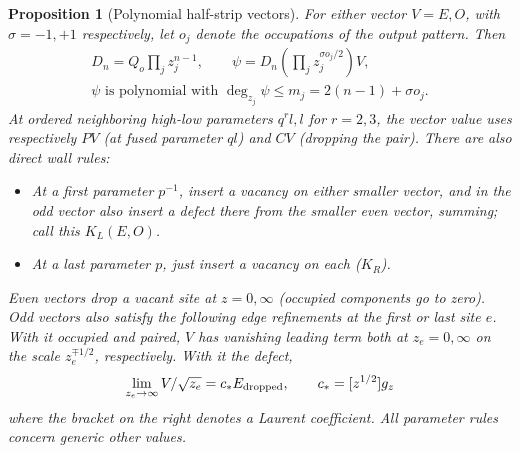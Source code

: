 \documentclass[11pt]{article}
\numberwithin{equation}{section}
\newtheorem{proposition}[theorem]{Proposition}
\theoremstyle{definition}\newtheorem{definition}[theorem]{Definition}
\theoremstyle{remark}\newtheorem{remark}[theorem]{Remark}
\begin{document}
\begin{proposition}[Polynomial half-strip vectors]\label{L:prop:strip-polynomials}
For either vector \(V=E,O\), with \(\sigma=-1,+1\) respectively, let \(o_j\)
denote the occupations of the output pattern. Then
\[
\begin{gathered}
 D_n=Q_o\prod_j z_j^{n-1},\qquad
 \psi= D_n \left(\prod_j z_j^{\sigma o_j/2}\right)V,\\
 \psi\text{ is polynomial with }\deg_{z_j}\psi\le m_j=2(n-1)+\sigma o_j.
\end{gathered}
\]
At ordered neighboring high-low parameters \(q^r l,l\) for \(r=2,3\), the vector value uses respectively \(P V\) (at fused parameter \(q l\)) and \(C V\) (dropping the pair). There are also direct wall rules:
\begin{itemize}
\item At a first parameter \(p^{-1}\), insert a vacancy on either smaller vector, and in the odd vector also insert a defect there from the smaller even vector, summing; call this \(K_L(E,O)\).
\item At a last parameter \(p\), just insert a vacancy on each (\(K_R\)).
\end{itemize}

Even vectors drop a vacant site at \(z=0,\infty\) (occupied components go to zero). Odd vectors also satisfy the following edge refinements at the first or last site \(e\). With it occupied and paired, \(V\) has vanishing leading term both at \(z_e=0,\infty\) on the scale \(z_e^{\mp1/2}\), respectively. With it the defect,
\[
 \lim_{z_e\to\infty} V/\sqrt{z_e}=c_* E_{\rm dropped},\qquad
 c_*=[z^{1/2}]g_z
\]
where the bracket on the right denotes a Laurent coefficient. All parameter rules concern generic other values.

\end{proposition}
\end{document}
